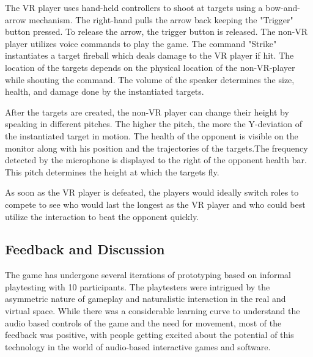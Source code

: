 \documentclass[convention]{aesconf}
\begin{document}
The VR player uses hand-held controllers to shoot at targets using a bow-and-arrow mechanism. The right-hand pulls the arrow back keeping the "Trigger" button pressed. To release the arrow, the trigger button is released. The non-VR player utilizes voice commands to play the game. The command "Strike" instantiates a target fireball which deals damage to the VR player if hit. The location of the targets depends on the physical location of the non-VR-player while shouting the command. The volume of the speaker determines the size, health, and damage done by the instantiated targets.

After the targets are created, the non-VR player can change their height by speaking in different pitches. The higher the pitch, the more the Y-deviation of the instantiated target in motion. The health of the opponent is visible on the monitor along with his position and the trajectories of the targets.The frequency detected by the microphone is displayed to the right of the opponent health bar. This pitch determines the height at which the targets fly.

As soon as the VR player is defeated, the players would ideally switch roles to compete to see who would last the longest as the VR player and who could best utilize the interaction to beat the opponent quickly.

\subsection{Feedback and Discussion} 
The game has undergone several iterations of prototyping based on informal playtesting with 10 participants. The playtesters were intrigued by the asymmetric nature of gameplay and naturalistic interaction in the real and virtual space. While there was a considerable learning curve to understand the audio based controls of the game and the need for movement, most of the feedback was positive, with people getting excited about the potential of this technology in the world of audio-based interactive games and software.
\end{document}
